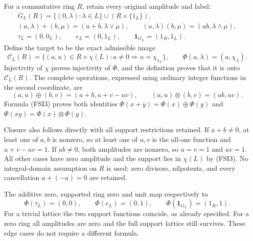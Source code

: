 For a commutative ring \(R\), retain every original amplitude and label:
\begin{equation}\tag{FSI11}
\begin{gathered}
G_L(R)=\{(0,\lambda):\lambda\in L\}\cup(R\times\{1_L\}),\\
(a,\lambda)+(b,\mu)=(a+b,\lambda\vee\mu),\qquad
(a,\lambda)(b,\mu)=(ab,\lambda\wedge\mu),\\
\tau_L=(0,0_L),\qquad e_L=(0,1_L),\qquad
\mathbf1_{G_L}=(1_R,1_L).
\end{gathered}
\end{equation}
Define the target to be the exact admissible image
\begin{equation}\tag{FSI12}
\mathcal C_L(R)=
\{(a,u)\in R\times\chi(L):a\ne0\Longrightarrow u=\chi_{1_L}\},
\qquad
\Phi(a,\lambda)=(a,\chi_\lambda).
\end{equation}
Injectivity of \(\chi\) proves injectivity of \(\Phi\), and the
definition proves that it is onto \(\mathcal C_L(R)\).
The complete operations, expressed using ordinary integer functions
in the second coordinate, are
\begin{equation}\tag{FSI13}
(a,u)\oplus(b,v)=(a+b,u+v-uv),\qquad
(a,u)\otimes(b,v)=(ab,uv).
\end{equation}
Formula (FSI3) proves both identities
\(\Phi(x+y)=\Phi(x)\oplus\Phi(y)\) and
\(\Phi(xy)=\Phi(x)\otimes\Phi(y)\).

Closure also follows directly with all support restrictions retained.
If \(a+b\ne0\), at least one of \(a,b\) is nonzero, so at least
one of \(u,v\) is the all-one function and \(u+v-uv=1\).
If \(ab\ne0\), both amplitudes are nonzero, so \(u=v=1\) and \(uv=1\).
All other cases have zero amplitude and the support lies in
\(\chi(L)\) by (FSI3).
No integral-domain assumption on \(R\) is used: zero divisors,
nilpotents, and every cancellation \(a+(-a)=0\) are retained.

The additive zero, supported ring zero and unit map respectively to
\begin{equation}\tag{FSI14}
\Phi(\tau_L)=(0,0),\qquad
\Phi(e_L)=(0,1),\qquad
\Phi(\mathbf1_{G_L})=(1_R,1).
\end{equation}
For a trivial lattice the two support functions coincide, as already
specified. For a zero ring all amplitudes are zero and the full
support lattice still survives. These edge cases do not require a
different formula.

